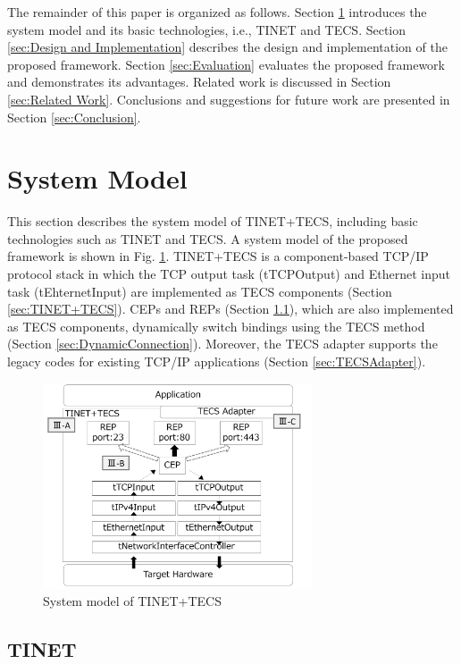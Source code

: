 \documentclass[conference]{IEEEtran/IEEEtran}
\begin{document}
The remainder of this paper is organized as follows.
Section \ref{sec:System Model} introduces the system model and its basic technologies, i.e., TINET and TECS.
Section \ref{sec:Design and Implementation} describes the design and implementation of the proposed framework.
Section \ref{sec:Evaluation} evaluates the proposed framework and demonstrates its advantages.
Related work is discussed in Section \ref{sec:Related Work}.
Conclusions and suggestions for future work are presented in Section \ref{sec:Conclusion}.


\section{System Model}
\label{sec:System Model}

This section describes the system model of TINET+TECS, including basic technologies such as TINET and TECS.
A system model of the proposed framework is shown in Fig. \ref{fig:SystemModel}.
TINET+TECS is a component-based TCP/IP protocol stack in which the TCP output task (tTCPOutput) and Ethernet input task (tEhternetInput) are implemented as TECS components (Section \ref{sec:TINET+TECS}).
CEPs and REPs (Section \ref{sec:TINET}), which are also implemented as TECS components, dynamically switch bindings using the TECS method (Section \ref{sec:DynamicConnection}).
Moreover, the TECS adapter supports the legacy codes for existing TCP/IP applications (Section \ref{sec:TECSAdapter}).

\begin{figure}[t]
    \centering
    \includegraphics[width=8.0cm,clip]{figure/SystemModel.pdf}
    \vspace{-1mm} \caption{System model of TINET+TECS}
    \vspace{-1mm} \label{fig:SystemModel}
\end{figure}

\subsection{TINET}
\label{sec:TINET}
\end{document}
